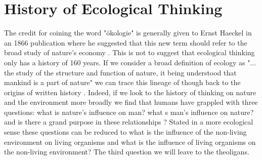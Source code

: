 \section {History of Ecological Thinking}

The credit for coining the word "ökologie" is generally given to Ernst Haeckel in an 1866 publication where he suggested that this new term should refer to the broad study of nature's economy \cite{worster_1977}. This is not to suggest that ecological thinking only has a history of 160 years. If we consider a broad definition of ecology as "... the study of the structure and function of nature, it being understood that mankind is a part of nature" we can trace this lineage of though back to the origins of written history \cite{odum_1953}. Indeed, if we look to the history of thinking on nature and the environment more broadly we find that humans have grappled with three questions: what is nature's influence on man? what s man's influence on nature? and is there a grand purpose in these relationships \cite{glacken_1967}? Stated in a more ecological sense these questions can be reduced to what is the influence of the non-living environment on living organisms and what is the influence of living organisms on the non-living environment? The third question we will leave to the theoligans.
